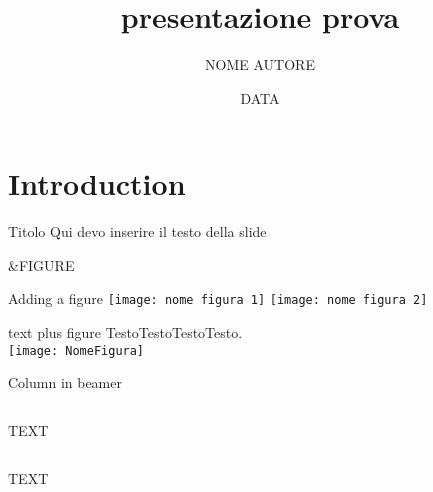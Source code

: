 \documentclass{beamer}
\title{presentazione prova}
\author{NOME AUTORE}
\date{DATA}
\begin{document}
\maketitle

\section{Introduction}
\begin{frame}{Titolo}
Qui devo inserire il testo della slide
\end{frame}

&FIGURE
\begin{frame}{Adding a figure}
\centering
 \texttt{[image: nome figura 1]}
 \texttt{[image: nome figura 2]}
\end{frame}
\begin{frame}{text plus figure}
\centering
 TestoTestoTestoTesto.\\
\smallskip
\texttt{[image: NomeFigura]} 
\end{frame}

\begin{frame}{Column in beamer}
\begin{columns}
\centering
 TEXT
 \end{columns}
\begin{columns}
\centering
 TEXT
 \end{columns}
\end{frame}
\end{document}
